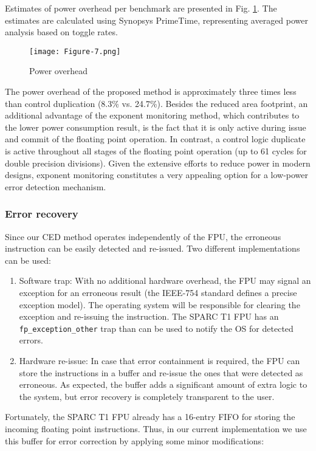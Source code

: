 \documentclass[12pt]{yalephd}
\begin{document}
Estimates of power overhead per benchmark are presented in Fig. \ref{sC3fFigPowerOverhead}. The estimates are calculated using Synopsys PrimeTime, representing averaged power analysis based on toggle rates.

\begin{figure}[!ht]
\centering
\texttt{[image: Figure-7.png]}
\caption{Power overhead}\label{sC3fFigPowerOverhead}
\end{figure}

The power overhead of the proposed method is approximately three times less than control duplication (8.3\% vs. 24.7\%). Besides the reduced area footprint, an additional advantage of the exponent monitoring method, which contributes to the lower power consumption result, is the fact that it is only active during issue and commit of the floating point operation. In contrast, a control logic duplicate is active throughout all stages of the floating point operation (up to 61 cycles for double precision divisions). Given the extensive efforts to reduce power in modern designs, exponent monitoring constitutes a very appealing option for a low-power error detection mechanism.

\subsubsection{Error recovery}

Since our CED method operates independently of the FPU, the erroneous instruction can be easily detected and re-issued. Two different implementations can be used:

\begin{enumerate}
	\item Software trap: With no additional hardware overhead, the FPU may signal an exception for an erroneous result (the IEEE-754 standard defines a precise exception model). The operating system will be responsible for clearing the exception and re-issuing the instruction. The SPARC T1 FPU has an {\tt fp\_exception\_other} trap than can be used to notify the OS for detected errors.
	\item Hardware re-issue: In case that error containment is required, the FPU can store the instructions in a buffer and re-issue the ones that were detected as erroneous. As expected, the buffer adds a significant amount of extra logic to the system, but error recovery is completely transparent to the user.
\end{enumerate}

Fortunately, the SPARC T1 FPU already has a 16-entry FIFO for storing the incoming floating point instructions. Thus, in our current implementation we use this buffer for error correction by applying some minor modifications:
\end{document}
